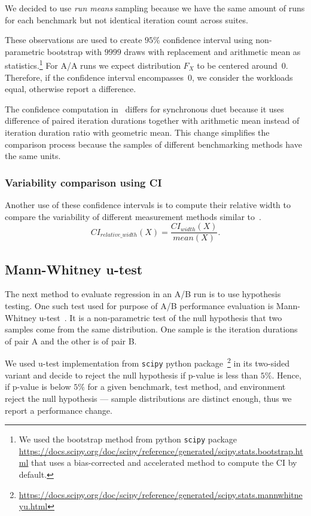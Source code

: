 We decided to use \emph{run means} sampling because we have the same amount of runs for each benchmark but not identical iteration count across suites.

These observations are used to create $95\%$ confidence interval using non-parametric bootstrap with $9999$ draws with replacement and arithmetic mean as statistics.\footnote{We used the bootstrap method from python \lstinline{scipy} package \url{https://docs.scipy.org/doc/scipy/reference/generated/scipy.stats.bootstrap.html} that uses a \mbox{bias-corrected} and accelerated method to compute the CI by default.}
For A/A runs we expect distribution $F_X$ to be centered around~$0$.
Therefore, if the confidence interval encompasses~$0$, we consider the workloads equal, otherwise report a difference.

The confidence computation in~\citet{bulej2020duet} differs for synchronous duet because it uses difference of paired iteration durations together with arithmetic mean instead of iteration duration ratio with geometric mean.
This change simplifies the comparison process because the samples of different benchmarking methods have the same units.
 
\subsubsection{Variability comparison using CI}
\label{sec:ci_width}

Another use of these confidence intervals is to compute their relative width to compare the variability of different measurement methods similar to~\citet{bulej2020duet}.
\begin{equation}\label{eq:relative_ci_width} 
CI_{relative\_width}(X) = \frac{CI_{width}(X)}{mean(X)}.
\end{equation}

\subsection{Mann-Whitney u-test}
\label{sec:utest}

The next method to evaluate regression in an A/B run is to use hypothesis testing.
One such test used for purpose of A/B performance evaluation is Mann-Whitney \mbox{u-test}~\cite{bulej2017stat,laaber2019software}.
It is a non-parametric test of the null hypothesis that two samples come from the same distribution.
One sample is the iteration durations of pair A and the other is of pair B.

We used \mbox{u-test} implementation from \lstinline{scipy} python package~\footnote{\url{https://docs.scipy.org/doc/scipy/reference/generated/scipy.stats.mannwhitneyu.html}} in its \mbox{two-sided} variant and decide to reject the null hypothesis if \mbox{p-value} is less than $5\%$.
Hence, if \mbox{p-value} is below $5\%$ for a given benchmark, test method, and environment reject the null hypothesis --- sample distributions are distinct enough, thus we report a performance change.

